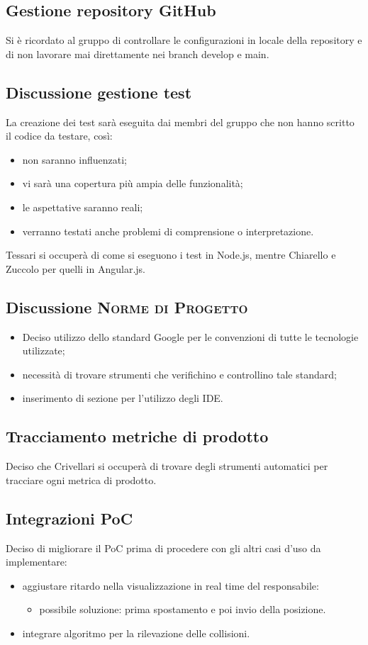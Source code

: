 \subsection{Gestione repository GitHub}
Si è ricordato al gruppo di controllare le configurazioni in locale della repository e di non lavorare mai direttamente nei branch develop e main.

\subsection{Discussione gestione test}
La creazione dei test sarà eseguita dai membri del gruppo che non hanno scritto il codice da testare, così:
	\begin{itemize}
		\item non saranno influenzati;
		\item vi sarà una copertura più ampia delle funzionalità;
		\item le aspettative saranno reali;
		\item verranno testati anche problemi di comprensione o interpretazione.
	\end{itemize}
Tessari si occuperà di come si eseguono i test in Node.js, mentre Chiarello e Zuccolo per quelli in Angular.js.
\subsection{Discussione \textsc{Norme di Progetto}}
\begin{itemize}
	\item Deciso utilizzo dello standard Google per le convenzioni di tutte le tecnologie utilizzate;
	\item necessità di trovare strumenti che verifichino e controllino tale standard;
	\item inserimento di sezione per l'utilizzo degli IDE.
\end{itemize}
\subsection{Tracciamento metriche di prodotto}
Deciso che Crivellari si occuperà di trovare degli strumenti automatici per tracciare ogni metrica di prodotto.

\subsection{Integrazioni PoC}
Deciso di migliorare il PoC prima di procedere con gli altri casi d'uso da implementare:
	\begin{itemize}
		\item aggiustare ritardo nella visualizzazione in real time del responsabile:
			\begin{itemize}
				\item possibile soluzione: prima spostamento e poi invio della posizione.
			\end{itemize}
		\item integrare algoritmo per la rilevazione delle collisioni.
	\end{itemize}
